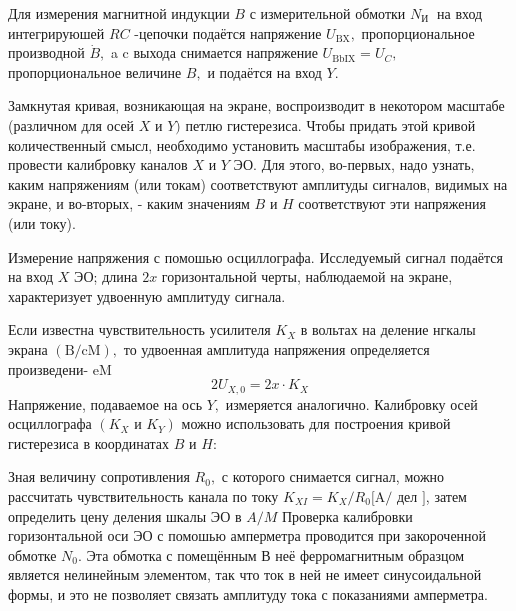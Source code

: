 \documentclass[12pt]{article}
\begin{document}
Для измерения магнитной индукции $B$ с измерительной обмотки $N_{\text {И }}$ на вход интегрируюшей $R C$ -цепочки подаётся напряжение $U_{\mathrm{BX}},$ пропорциональное производной $\dot{B},$ a $\mathrm{c}$ выхода снимается напряжение $U_{\mathrm{BbIX}}=U_{C},$ пропорциональное величине $B,$ и подаётся на вход $Y$.

Замкнутая кривая, возникающая на экране, воспроизводит в некотором масштабе (различном для осей $X$ и $Y)$ петлю гистерезиса. Чтобы придать этой кривой количественный смысл, необходимо установить масштабы изображения, т.е. провести калибровку каналов $X$ и $Y$ ЭО. Для этого, во-первых, надо узнать, каким напряжениям (или токам) соответствуют амплитуды сигналов, видимых на экране, и во-вторых, - каким значениям $B$ и $H$ соответствуют эти напряжения (или току).

Измерение напряжения с помошью осциллографа. Исследуемый сигнал подаётся на вход $X$ ЭО; длина $2 x$ горизонтальной черты, наблюдаемой на экране, характеризует удвоенную амплитуду сигнала.

Если известна чувствительность усилителя $K_{X}$ в вольтах на деление нгкалы экрана $(\mathrm{B} / \mathrm{cM}),$ то удвоенная амплитуда напряжения определяется произведени-
eM
$$
2 U_{X, 0}=2 x \cdot K_{X}
$$
Напряжение, подаваемое на ось $Y,$ измеряется аналогично. Калибровку осей осциллографа $\left(K_{X}\right.$ и $\left.K_{Y}\right)$ можно использовать для построения кривой гистерезиса в координатах $B$ и $H:$

Зная величину сопротивления $R_{0},$ с которого снимается сигнал, можно рассчитать чувствительность канала по току $K_{X I}=K_{X} / R_{0}[\mathrm{A} /$ дел $]$, затем определить цену деления шкалы ЭО в $A / M$
Проверка калибровки горизонтальной оси ЭО с помошью амперметра проводится при закороченной обмотке $N_{0} .$ Эта обмотка с помещённым В неё ферромагнитным образцом является нелинейным элементом, так что ток в ней не имеет синусоидальной формы, и это не позволяет связать амплитуду тока с показаниями амперметра.
\end{document}
